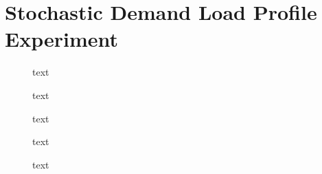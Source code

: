 \section{Stochastic Demand Load Profile Experiment}

\begin{figure}[h]
	\centering
	
	\caption{text}
\end{figure}

\begin{figure}[h]
	\centering
	
	
	\caption{text}
	
	\vspace*{2cm}
	
	
	\caption{text}
\end{figure}

\begin{figure}[h]
	\centering

	
	\caption{text}
	
	\vspace*{2cm}
	
	
	\caption{text}
\end{figure}